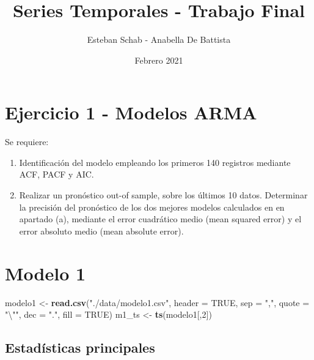 \documentclass[
  11pt,
]{article}
\title{Series Temporales - Trabajo Final}
\author{Esteban Schab - Anabella De Battista}
\date{Febrero 2021}
\newenvironment{Shaded}{\begin{snugshade}}{\end{snugshade}}
\newcommand{\CharTok}[1]{\textcolor[rgb]{0.31,0.60,0.02}{#1}}
\newcommand{\DataTypeTok}[1]{\textcolor[rgb]{0.13,0.29,0.53}{#1}}
\newcommand{\DecValTok}[1]{\textcolor[rgb]{0.00,0.00,0.81}{#1}}
\newcommand{\KeywordTok}[1]{\textcolor[rgb]{0.13,0.29,0.53}{\textbf{#1}}}
\newcommand{\NormalTok}[1]{#1}
\newcommand{\OtherTok}[1]{\textcolor[rgb]{0.56,0.35,0.01}{#1}}
\newcommand{\StringTok}[1]{\textcolor[rgb]{0.31,0.60,0.02}{#1}}
\begin{document}
\maketitle

{
\setcounter{tocdepth}{2}
\tableofcontents
}
\clearpage

\hypertarget{ejercicio-1---modelos-arma}{%
\section{Ejercicio 1 - Modelos ARMA}\label{ejercicio-1---modelos-arma}}

Se requiere:

\begin{enumerate}
\def\labelenumi{\alph{enumi}.}
\item
  Identificación del modelo empleando los primeros 140 registros
  mediante ACF, PACF y AIC.
\item
  Realizar un pronóstico out-of sample, sobre los últimos 10 datos.
  Determinar la precisión del pronóstico de los dos mejores modelos
  calculados en en apartado (a), mediante el error cuadrático medio
  (mean squared error) y el error absoluto medio (mean absolute error).
\end{enumerate}

\hypertarget{modelo-1}{%
\section{Modelo 1}\label{modelo-1}}

\begin{Shaded}
\begin{Highlighting}[]
\NormalTok{modelo1 <-}\StringTok{ }\KeywordTok{read.csv}\NormalTok{(}\StringTok{"./data/modelo1.csv"}\NormalTok{, }\DataTypeTok{header =} \OtherTok{TRUE}\NormalTok{, }\DataTypeTok{sep =} \StringTok{","}\NormalTok{, }\DataTypeTok{quote =} \StringTok{"}\CharTok{\textbackslash{}"}\StringTok{"}\NormalTok{, }
                    \DataTypeTok{dec =} \StringTok{"."}\NormalTok{, }\DataTypeTok{fill =} \OtherTok{TRUE}\NormalTok{)}
\NormalTok{m1_ts <-}\StringTok{ }\KeywordTok{ts}\NormalTok{(modelo1[,}\DecValTok{2}\NormalTok{])}
\end{Highlighting}
\end{Shaded}

\hypertarget{estaduxedsticas-principales}{%
\subsection{Estadísticas
principales}\label{estaduxedsticas-principales}}
\end{document}
